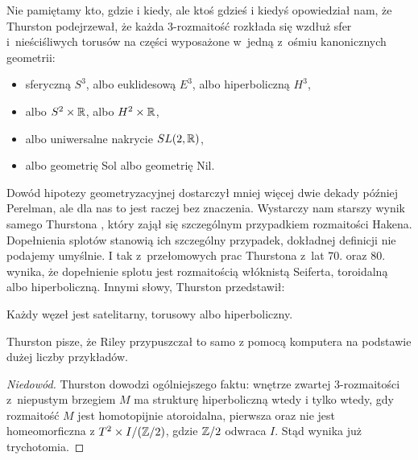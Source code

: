 Nie pamiętamy kto, gdzie i kiedy, ale ktoś gdzieś i kiedyś opowiedział nam, że Thurston podejrzewał, że każda 3-rozmaitość rozkłada się wzdłuż sfer i~nieściśliwych torusów na części wyposażone w~jedną z~ośmiu kanonicznych geometrii:
\begin{itemize}
\item sferyczną $S^3$, albo euklidesową $E^3$, albo hiperboliczną $H^3$,
\item albo $S^2 \times \mathbb R$, albo $H^2 \times \mathbb R$,
\item albo uniwersalne nakrycie $SL(2, \mathbb R)$,
\item albo geometrię Sol albo geometrię Nil.
\end{itemize}
%
Dowód hipotezy geometryzacyjnej dostarczył mniej więcej dwie dekady później Perelman, ale dla nas to jest raczej bez znaczenia.
%
Wystarczy nam starszy wynik samego Thurstona \cite{thurston1982}, który zajął się szczególnym przypadkiem rozmaitości Hakena.
%
Dopełnienia splotów stanowią ich szczególny przypadek, dokładnej definicji nie podajemy umyślnie.
I tak z~przełomowych prac Thurstona z~lat 70. oraz 80. wynika, że dopełnienie splotu jest rozmaitością włóknistą Seiferta, toroidalną albo hiperboliczną.
%
%
%
Innymi słowy, Thurston przedstawił:

\begin{theorem}
%
%
%
    Każdy węzeł jest satelitarny, torusowy albo hiperboliczny.
\end{theorem}

Thurston pisze, że Riley przypuszczał to samo z pomocą komputera na podstawie dużej liczby przykładów.
%
%

\begin{proof}[Niedowód]
    Thurston \cite[s. 360]{thurston1982} dowodzi ogólniejszego faktu: wnętrze zwartej 3-rozmaitości z~niepustym brzegiem $M$ ma strukturę hiperboliczną wtedy i tylko wtedy, gdy rozmaitość $M$ jest homotopijnie atoroidalna, pierwsza oraz nie jest homeomorficzna z $T^2 \times I / (\mathbb Z/2)$, gdzie $\mathbb Z/2$ odwraca $I$.
    Stąd wynika już trychotomia.
\end{proof}

